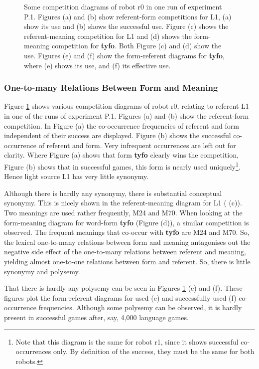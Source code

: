 \begin{figure}
\caption{Some competition diagrams of robot r0 in one run of experiment P.1. Figures (a) and (b) show referent-form competitions for L1, (a) show its use and (b) shows the successful use. Figure (c) shows the referent-meaning competition for L1 and (d) shows the form-meaning competition for {\bf tyfo}. Both Figure (c) and (d) show the use. Figures (e) and (f) show the form-referent diagrams for {\bf tyfo}, where (e) shows its use, and (f) its effective use.}
\label{f:opt:ggcomp1}
\end{figure}

\subsubsection{One-to-many Relations Between Form and Meaning}

Figure \ref{f:opt:ggcomp1} shows various competition diagrams of robot r0, relating to referent L1 in one of the runs of experiment P.1. Figures (a) and (b) show the referent-form competition. In Figure (a) the co-occurrence frequencies of referent and form independent of their success are displayed. Figure (b) shows the successful co-occurrence of referent and form. Very infrequent occurrences are left out for clarity. Where Figure (a) shows that form {\bf tyfo} clearly wins the competition, Figure (b) shows that  in successful games, this form is nearly used uniquely\footnote{Note that this diagram is the same for robot r1, since it shows successful co-occurrences only. By definition of the success, they must be the same for both robots.}. Hence light source L1 has very little synonymy. 

Although there is hardly any synonymy, there is substantial conceptual synonymy. This is nicely shown in the referent-meaning diagram for L1 ( (c)). Two meanings are used rather frequently, M24 and M70. When looking at the form-meaning diagram for word-form {\bf tyfo} (Figure (d)), a similar competition is observed. The frequent meanings that co-occur with {\bf tyfo} are M24 and M70. So, the lexical one-to-many relations between form and meaning antagonises out the negative side effect of the one-to-many relations between referent and meaning, yielding almost one-to-one relations between form and referent. So, there is little synonymy and polysemy. 

That there is hardly any polysemy can be seen in Figures \ref{f:opt:ggcomp1} (e) and (f). These figures plot the form-referent diagrams for used (e) and successfully used (f) co-occurrence frequencies. Although some polysemy can be observed, it is hardly present in successful games after, say, 4,000 language games.


